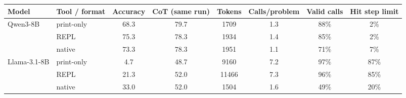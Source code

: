 \begin{tabular}{llcccccc}
\toprule
Model & Tool / format & Accuracy & CoT (same run) & Tokens & Calls/problem & Valid calls & Hit step limit \\
\midrule
Qwen3-8B & print-only & 68.3 & 79.7 & 1709 & 1.3 & 88\% & 2\% \\
 & REPL & 75.3 & 78.3 & 1934 & 1.4 & 85\% & 2\% \\
 & native & 73.3 & 78.3 & 1951 & 1.1 & 71\% & 7\% \\
\midrule
Llama-3.1-8B & print-only & 4.7 & 48.7 & 9160 & 7.2 & 97\% & 87\% \\
 & REPL & 21.3 & 52.0 & 11466 & 7.3 & 96\% & 85\% \\
 & native & 33.0 & 52.0 & 1504 & 1.6 & 49\% & 20\% \\
\bottomrule
\end{tabular}
